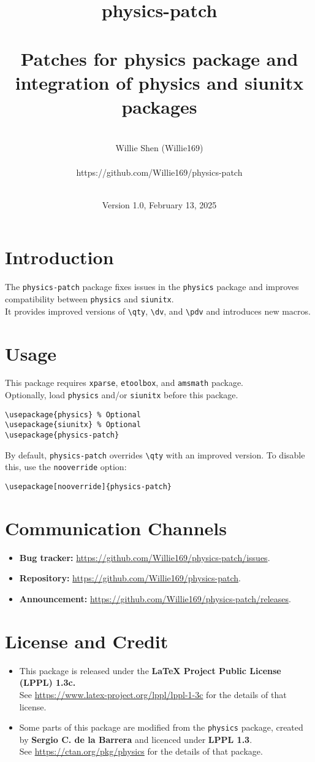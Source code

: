\documentclass[a4paper,12pt]{article}
\title{{\huge physics-patch}\\\mbox{}\\{\Large\textnormal{Patches for physics package and integration of physics and siunitx packages}}}
\author{{\LARGE\mbox{}\\Willie Shen (Willie169)}\\\mbox{}\\{\Large https://github.com/Willie169/physics-patch}}
\date{\Large\mbox{}\\Version 1.0, February 13, 2025}
\let\patchedquantity\patchedphysicsquantity
\let\qty\patchedquantity
\let\dv\derivative
\let\pdv\partialderivative
\renewcommand{\maketitle}{
\begin{titlepage}
\begin{center}
\vspace*{\fill}
{\huge \bfseries \thetitle\par}
\vskip 1.5em
{\Large \theauthor\par}
\vskip 1em
{\large \thedate\par}
\vspace*{\fill}
\end{center}
\end{titlepage}
}
\begin{document}
\thispagestyle{empty}\Needspace{1\textheight}\maketitle\Needspace{1\textheight}\setcounter{page}{1}
\section{Introduction}
The \texttt{physics-patch} package fixes issues in the \texttt{physics} package and improves compatibility between \texttt{physics} and \texttt{siunitx}.\\
It provides improved versions of \verb|\qty|, \verb|\dv|, and \verb|\pdv| and introduces new macros.
\section{Usage}
This package requires \texttt{xparse}, \texttt{etoolbox}, and \texttt{amsmath} package.\\
Optionally, load \texttt{physics} and/or \texttt{siunitx} before this package.
\begin{verbatim}
\usepackage{physics} % Optional
\usepackage{siunitx} % Optional
\usepackage{physics-patch}
\end{verbatim}
By default, \texttt{physics-patch} overrides \verb|\qty| with an improved version. To disable this, use the \texttt{nooverride} option:
\begin{verbatim}
\usepackage[nooverride]{physics-patch}
\end{verbatim}
\section{Communication Channels}
\begin{itemize}
\item \textbf{Bug tracker:} \href{https://github.com/Willie169/physics-patch/issues}{https://github.com/Willie169/physics-patch/issues}.
\item \textbf{Repository:} \href{https://github.com/Willie169/physics-patch}{https://github.com/Willie169/physics-patch}.
\item \textbf{Announcement:} \href{https://github.com/Willie169/physics-patch/releases}{https://github.com/Willie169/physics-patch/releases}.
\end{itemize}
\section{License and Credit}
\begin{itemize}
\item
This package is released under the \textbf{LaTeX Project Public License (LPPL) 1.3c.}\\
See \href{https://www.latex-project.org/lppl/lppl-1-3c}{https://www.latex-project.org/lppl/lppl-1-3c} for the details of that license.
\item Some parts of this package are modified from the \texttt{physics} package, created by \textbf{Sergio C. de la Barrera} and licenced under \textbf{LPPL 1.3}.\\
See \href{https://ctan.org/pkg/physics}{https://ctan.org/pkg/physics} for the details of that package.
\end{itemize}
\end{document}
